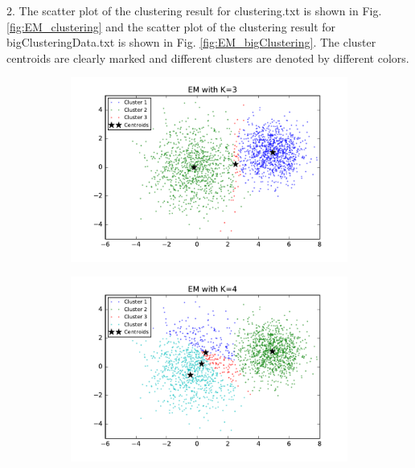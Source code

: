 \begin{description}
\begin{description}
\item{2.} The scatter plot of the clustering result for clustering.txt is shown in Fig. \ref{fig:EM_clustering} and the scatter plot of the clustering result for bigClusteringData.txt is shown in Fig. \ref{fig:EM_bigClustering}. The cluster centroids are clearly marked and different clusters are denoted by different colors. 

\begin{figure}[!h]
        \centering
        \begin{subfigure}[b]{0.475\textwidth}
            \centering
            \includegraphics[width=\textwidth]{./figures/clustering_EM_3.pdf}
        \end{subfigure}
        \hfill
        \begin{subfigure}[b]{0.475\textwidth}  
            \centering 
            \includegraphics[width=\textwidth]{./figures/clustering_EM_4.pdf}

\end{subfigure}
\end{figure}
\end{description}
\end{description}
